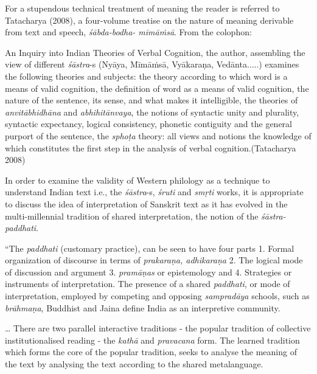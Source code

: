 For a stupendous technical treatment of meaning the reader is referred to Tatacharya (2008), a four-volume treatise on the nature of meaning derivable from text and speech, \textit{śābda-bodha- mīmāṁsā}. From the colophon:

\begin{myquote}
An Inquiry into Indian Theories of Verbal Cognition, the author, assembling the view of different \textit{śāstra}-s (Nyāya, Mīmāṁsā, Vyākaraṇa, Vedānta.....) examines the following theories and subjects: the theory according to which word is a means of valid cognition, the definition of word as a means of valid cognition, the nature of the sentence, its sense, and what makes it intelligible, the theories of \textit{anvitābhidhāna} and \textit{abhihitānvaya}, the notions of syntactic unity and plurality, syntactic expectancy, logical consistency, phonetic contiguity and the general purport of the sentence, the \textit{sphoṭa} theory: all views and notions the knowledge of which constitutes the first step in the analysis of verbal cognition.\hfill (Tatacharya 2008)
\end{myquote}

In order to examine the validity of Western philology as a technique to understand Indian text i.e., the \textit{śāstra}-s, \textit{śruti} and \textit{smṛti} works, it is appropriate to discuss the idea of interpretation of Sanskrit text as it has evolved in the multi-millennial tradition of shared interpretation, the notion of the \textit{śāstra-paddhati}.

\begin{myquote}
“The \textit{paddhati} (customary practice), can be seen to have four parts 1. Formal organization of discourse in terms of \textit{prakaraṇa, adhikaraṇa} 2. The logical mode of discussion and argument 3. \textit{pramāṇas} or epistemology and 4. Strategies or instruments of interpretation. The presence of a shared \textit{paddhati}, or mode of interpretation, employed by competing and opposing \textit{sampradāya} schools, such as \textit{brāhmaṇa}, Buddhist and Jaina define India as an interpretive community.
\end{myquote}

\begin{myquote}
… There are two parallel interactive traditions - the popular tradition of collective institutionalised reading - the \textit{kathā} and \textit{pravacana} form. The learned tradition which forms the core of the popular tradition, seeks to analyse the meaning of the text by analysing the text according to the shared metalanguage.
\end{myquote}

